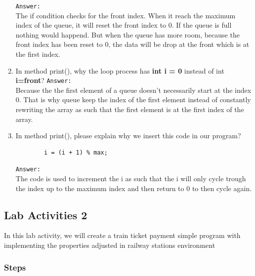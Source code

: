 \documentclass[12pt,titlepage]{article}
\begin{document}
\begin{enumerate}
    \texttt{Answer: }
    \mbox{}\\
    The if condition checks for the front index. When it reach the maximum index of the queue, it will reset the front index to 0. If the queue is full nothing would happend. But when the queue has more room, because the front index has been reset to 0, the data will be drop at the front which is at the first index.
    \item In method print(), why the loop process has \textbf{int i = 0} instead of int \textbf{i=front}?
    \texttt{Answer: }
    \mbox{}\\
    Because the the first element of a queue doesn't necessarily start at the index 0. That is why queue keep the index of the first element instead of constantly rewriting the array as such that the first element is at the first index of the array.
    \item In method print(), please explain why we insert this code in our program?
    \begin{verbatim}
        i = (i + 1) % max;
    \end{verbatim}
    \texttt{Answer: }
    \mbox{}\\
    The code is used to increment the i as such that the i will only cycle trough the index up to the maximum index and then return to 0 to then cycle again.
\end{enumerate}

\subsection{Lab Activities 2}
In this lab activity, we will create a train ticket payment simple program with implementing the properties adjusted in railway stations environment
\subsubsection{Steps}
\end{document}
